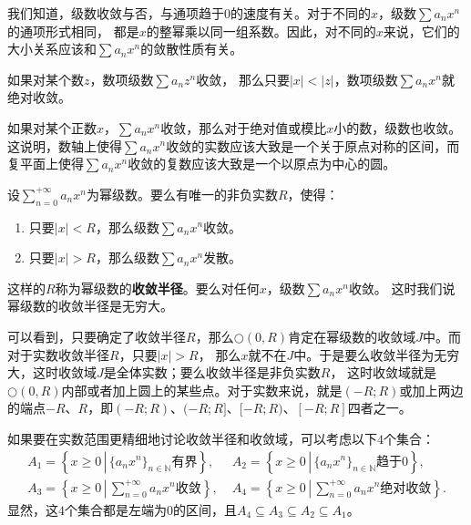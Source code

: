 \documentclass[12pt,UTF8,fontset=none]{ctexbook}
\begin{document}
\begin{appendix}
我们知道，级数收敛与否，与通项趋于$0$的速度有关。对于不同的$x$，级数$\sum a_n x^n$的通项形式相同，
都是$x$的整幂乘以同一组系数。因此，对不同的$x$来说，它们的大小关系应该和$\sum a_n x^n$的敛散性质有关。

\begin{tm}\label{tm:a-1-0}
    如果对某个数$z$，数项级数$\sum a_n z^n$收敛，
    那么只要$|x|<|z|$，数项级数$\sum a_n x^n$就绝对收敛。
\end{tm}

如果对某个正数$x$，$\sum a_n x^n$收敛，那么对于绝对值或模比$x$小的数，级数也收敛。
这说明，数轴上使得$\sum a_n x^n$收敛的实数应该大致是一个关于原点对称的区间，而复平面上使得$\sum a_n x^n$收敛的复数应该大致是一个以原点为中心的圆。

\begin{tm}\label{tm:a-1-10}
    设$\displaystyle\sum_{n=0}^{+\infty} a_n x^n$为幂级数。要么有唯一的非负实数$R$，使得：
    \begin{enumerate}
        \item 只要$|x|<R$，那么级数$\sum a_n x^n$收敛。
        \item 只要$|x|>R$，那么级数$\sum a_n x^n$发散。
    \end{enumerate}
    这样的$R$称为幂级数的\textbf{收敛半径}。要么对任何$x$，级数$\sum a_n x^n$收敛。
    这时我们说幂级数的收敛半径是无穷大。
\end{tm}

可以看到，只要确定了收敛半径$R$，那么$\bigcirc(0,R)$肯定在幂级数的收敛域$J$中。而对于实数收敛半径$R$，只要$|x|>R$，
那么$x$就不在$J$中。于是要么收敛半径为无穷大，这时收敛域$J$是全体实数；要么收敛半径是非负实数$R$，
这时收敛域就是$\bigcirc(0,R)$内部或者加上圆上的某些点。对于实数来说，就是$(-R;R)$或加上两边的端点$-R$、$R$，即$(-R;R)$、$(-R;R]$、$[-R;R)$、$[-R;R]$四者之一。

如果要在实数范围更精细地讨论收敛半径和收敛域，可以考虑以下$4$个集合：
\begin{align*}
    A_1 = \left\{ x \geqslant 0 \, \left| \, \{a_n x^n\}_{n\in\mathbb{N}}\mbox{有界} \right. \right\}, &\; A_2 = \left\{ x \geqslant 0 \, \left| \, \{a_n x^n\}_{n\in\mathbb{N}}\mbox{趋于}0 \right. \right\}, \\[4pt]
    A_3 = \left\{ x \geqslant 0 \, \left| \, \sum_{n=0}^{+\infty} a_n x^n \mbox{收敛} \right. \right\}, &\; A_4 =  \left\{ x \geqslant 0 \, \left| \, \sum_{n=0}^{+\infty} a_n x^n \mbox{绝对收敛} \right. \right\}.
\end{align*}
显然，这$4$个集合都是左端为$0$的区间，且$A_4\subseteq A_3 \subseteq A_2\subseteq A_1$。


\end{appendix}
\end{document}
